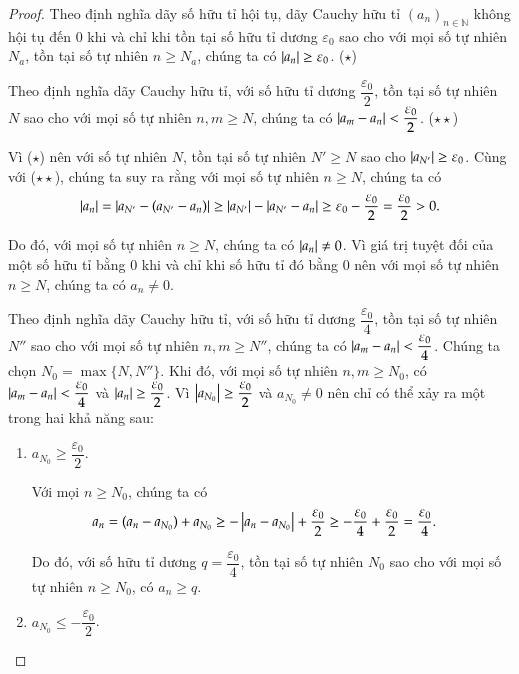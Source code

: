 \begin{proof}
    Theo định nghĩa dãy số hữu tỉ hội tụ, dãy Cauchy hữu tỉ ${(a_{n})}_{n\in\mathbb{N}}$ không hội tụ đến $0$ khi và chỉ khi tồn tại số hữu tỉ dương $\varepsilon_{0}$ sao cho với mọi số tự nhiên $N_{a}$, tồn tại số tự nhiên $n\geq N_{a}$, chúng ta có $\left\vert{a_{n}}\right\vert \geq \varepsilon_{0}$. ($\star$)

    Theo định nghĩa dãy Cauchy hữu tỉ, với số hữu tỉ dương $\dfrac{\varepsilon_{0}}{2}$, tồn tại số tự nhiên $N$ sao cho với mọi số tự nhiên $n, m\geq N$, chúng ta có $\left\vert{a_{m} - a_{n}}\right\vert < \dfrac{\varepsilon_{0}}{2}$. ($\star\star$)

    Vì ($\star$) nên với số tự nhiên $N$, tồn tại số tự nhiên $N'\geq N$ sao cho $\left\vert{a_{N'}}\right\vert \geq \varepsilon_{0}$. Cùng với ($\star\star$), chúng ta suy ra rằng với mọi số tự nhiên $n\geq N$, chúng ta có
    \[
        \left\vert{a_{n}}\right\vert = \left\vert{a_{N'} - (a_{N'} - a_{n})}\right\vert \geq \left\vert{a_{N'}}\right\vert - \left\vert{a_{N'} - a_{n}}\right\vert \geq \varepsilon_{0} - \frac{\varepsilon_{0}}{2} = \frac{\varepsilon_{0}}{2} > 0.
    \]

    Do đó, với mọi số tự nhiên $n\geq N$, chúng ta có $\left\vert{a_{n}}\right\vert\ne 0$. Vì giá trị tuyệt đối của một số hữu tỉ bằng $0$ khi và chỉ khi số hữu tỉ đó bằng $0$ nên với mọi số tự nhiên $n\geq N$, chúng ta có $a_{n}\ne 0$.

    Theo định nghĩa dãy Cauchy hữu tỉ, với số hữu tỉ dương $\dfrac{\varepsilon_{0}}{4}$, tồn tại số tự nhiên $N''$ sao cho với mọi số tự nhiên $n, m\geq N''$, chúng ta có $\left\vert{a_{m} - a_{n}}\right\vert < \dfrac{\varepsilon_{0}}{4}$. Chúng ta chọn $N_{0} = \max\{ N, N'' \}$. Khi đó, với mọi số tự nhiên $n, m\geq N_{0}$, có $\left\vert{a_{m} - a_{n}}\right\vert < \dfrac{\varepsilon_{0}}{4}$ và $\left\vert{a_{n}}\right\vert\geq\dfrac{\varepsilon_{0}}{2}$. Vì $\left\vert{a_{N_{0}}}\right\vert\geq\dfrac{\varepsilon_{0}}{2}$ và $a_{N_{0}}\ne 0$ nên chỉ có thể xảy ra một trong hai khả năng sau:
    \begin{enumerate}[label={\textbf{Khả năng \arabic*.}},itemindent=2cm]
        \item $a_{N_{0}}\geq \dfrac{\varepsilon_{0}}{2}$.

              Với mọi $n\geq N_{0}$, chúng ta có
              \begin{align*}
                  a_{n} & = (a_{n} - a_{N_{0}}) + a_{N_{0}} \geq -\left\vert{a_{n} - a_{N_{0}}}\right\vert + \frac{\varepsilon_{0}}{2} \geq -\frac{\varepsilon_{0}}{4} + \frac{\varepsilon_{0}}{2} = \frac{\varepsilon_{0}}{4}.
              \end{align*}

              Do đó, với số hữu tỉ dương $q = \dfrac{\varepsilon_{0}}{4}$, tồn tại số tự nhiên $N_{0}$ sao cho với mọi số tự nhiên $n\geq N_{0}$, có $a_{n}\geq q$.
        \item $a_{N_{0}}\leq -\dfrac{\varepsilon_{0}}{2}$.


\end{enumerate}
\end{proof}
